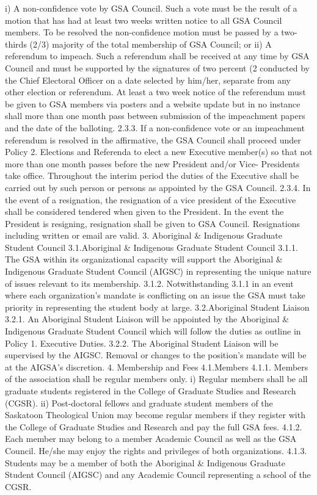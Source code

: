 \documentclass{article}
\begin{document}
i) A non-confidence vote by GSA Council. Such a vote must be the 
result of a motion that has had at least two weeks written notice to all GSA Council members. To be resolved the non-confidence motion 
must be passed by a two-thirds (2/3) majority of the total membership 
of GSA Council; or 
ii) A referendum to impeach. Such a referendum shall be received at any 
time by GSA Council and must be supported by the signatures of two 
percent (2%
conducted by the Chief Electoral Officer on a date selected by him/her, 
separate from any other election or referendum. At least a two week 
notice of the referendum must be given to GSA members via posters 
and a website update but in no instance shall more than one month 
pass between submission of the impeachment papers and the date of 
the balloting. 
2.3.3. If a non-confidence vote or an impeachment referendum is resolved in 
the affirmative, the GSA Council shall proceed under Policy 2. 
Elections and Referenda to elect a new Executive member(s) so that 
not more than one month passes before the new President and/or Vice- 
Presidents take office. Throughout the interim period the duties of the 
Executive shall be carried out by such person or persons as appointed 
by the GSA Council. 
2.3.4. In the event of a resignation, the resignation of a vice president of the 
Executive shall be considered tendered when given to the President. In 
the event the President is resigning, resignation shall be given to GSA 
Council. Resignations including written or email are valid. 
3. Aboriginal \& Indigenous Graduate Student Council 
3.1.Aboriginal \& Indigenous Graduate Student Council 
3.1.1. The GSA within its organizational capacity will support the Aboriginal 
\& Indigenous Graduate Student Council (AIGSC) in representing the 
unique nature of issues relevant to its membership. 
3.1.2. Notwithstanding 3.1.1 in an event where each organization’s mandate 
is conflicting on an issue the GSA must take priority in representing 
the student body at large. 
3.2.Aboriginal Student Liaison 
3.2.1. An Aboriginal Student Liaison will be appointed by the Aboriginal \& 
Indigenous Graduate Student Council which will follow the duties as outline 
in Policy 1. Executive Duties. 
3.2.2. The Aboriginal Student Liaison will be supervised by the AIGSC. 
Removal or changes to the position’s mandate will be at the AIGSA’s 
discretion. 
4. Membership and Fees 
4.1.Members 
4.1.1. Members of the association shall be regular members only. 
i) Regular members shall be all graduate students registered in the 
College of Graduate Studies and Research (CGSR). 
ii) Post-doctoral fellows and graduate student members of the Saskatoon 
Theological Union may become regular members if they register with 
the College of Graduate Studies and Research and pay the full GSA 
fees. 
4.1.2. Each member may belong to a member Academic Council as well as 
the GSA Council. He/she may enjoy the rights and privileges of both 
organizations. 
4.1.3. Students may be a member of both the Aboriginal \& Indigenous 
Graduate Student Council (AIGSC) and any Academic Council 
representing a school of the CGSR. 
 
\end{document}
